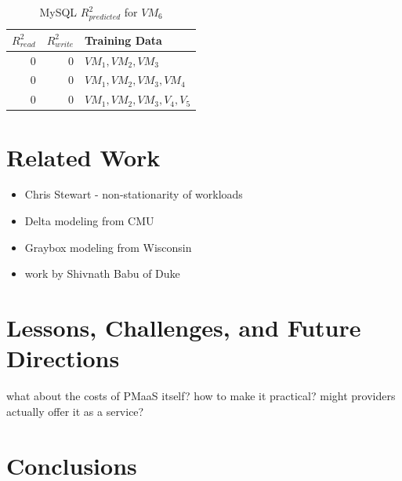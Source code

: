 \documentclass{acm_proc_article-sp}
\begin{document}
\begin{table}
\centering
\caption{MySQL $R_{predicted}^2$ for $VM_6$}
\begin{tabular}{|r|r|l|} \hline
$R_{read}^2$&$R_{write}^2$&Training Data\\ \hline
0 & 0& $VM_1,VM_2,VM_3$\\ \hline
0 & 0& $VM_1,VM_2,VM_3,VM_4$\\ \hline
0 & 0& $VM_1,VM_2,VM_3,V_4,V_5$\\ \hline
\hline\end{tabular}
\label{table:mysql}
\end{table}

\section{Related Work}
\label{sec:related}
\vspace{10pt}

\begin{itemize}
   \item Chris Stewart - non-stationarity of workloads
   \item Delta modeling from CMU
   \item Graybox modeling from Wisconsin
   \item work by Shivnath Babu of Duke
\end{itemize}


\section{Lessons, Challenges, and Future Directions}
\label{sec:future}
\vspace{10pt}

what about the costs of PMaaS itself? how to make it practical? might providers actually offer it as a service?

\section{Conclusions}
\label{sec:conclus}
\vspace{10pt}



%

%
%

\balancecolumns
\end{document}
